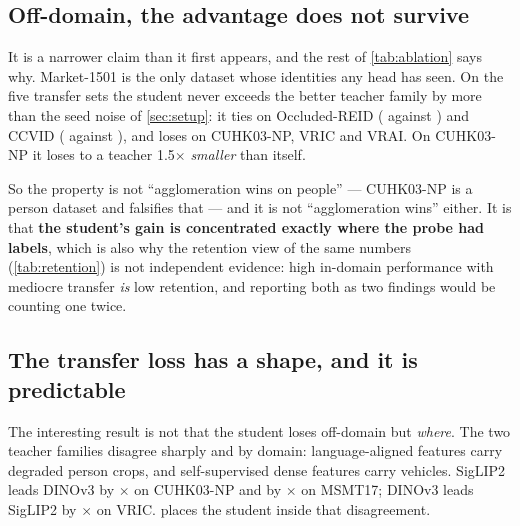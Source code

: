 \subsection{Off-domain, the advantage does not survive}
It is a narrower claim than it first appears, and the rest of \cref{tab:ablation} says why.
Market-1501 is the only dataset whose identities any head has seen. On the five transfer sets
the student never exceeds the better teacher family by more than the seed noise of
\cref{sec:setup}: it ties on Occluded-REID (\familyStudentOccluded{} against
\familySiglipOccluded{}) and CCVID (\familyStudentCcvid{} against \familySiglipCcvid{}), and
loses on CUHK03-NP, VRIC and VRAI. On CUHK03-NP it loses to a teacher 1.5$\times$
\emph{smaller} than itself.

So the property is not ``agglomeration wins on people'' --- CUHK03-NP is a person dataset and
falsifies that --- and it is not ``agglomeration wins'' either. It is that \textbf{the
student's gain is concentrated exactly where the probe had labels}, which is also why the
retention view of the same numbers (\cref{tab:retention}) is not independent evidence: high
in-domain performance with mediocre transfer \emph{is} low retention, and reporting both as
two findings would be counting one twice.

\begin{table}[t]
\centering
\caption{Retention: target mAP divided by source mAP, for the one head fitted on
\texttt{market1501/train}. The absolute source column is printed beside the ratios on purpose
--- a retention ratio flatters a weak source model, and CLIP's Occluded-REID and CCVID entries
are exactly that trap.}
\label{tab:retention}
\scriptsize
\setlength{\tabcolsep}{3pt}

\end{table}

\subsection{The transfer loss has a shape, and it is predictable}
The interesting result is not that the student loses off-domain but \emph{where}. The two
teacher families disagree sharply and by domain: language-aligned features carry degraded
person crops, and self-supervised dense features carry vehicles. SigLIP2 leads DINOv3 by
\spreadCuhk{}$\times$ on CUHK03-NP and by \spreadMsmt{}$\times$ on MSMT17; DINOv3 leads SigLIP2
by \spreadVric{}$\times$ on VRIC.  places the student inside that
disagreement.

